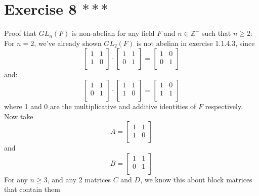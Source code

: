 \documentclass[12pt]{article}
\newcommand{\Z}{\mathbb{Z}}
\begin{document}
    \section*{Exercise 8 $***$}
    Proof that $GL_n(F)$ is non-abelian for any field $F$
    and $n \in \Z^+$ such that $n \geqslant 2$: \\
    For $n = 2$, we've already shown $GL_2(F)$ is not abelian in exercise
    1.1.4.3, since  
    \[ \begin{bmatrix}
        1 & 1 \\
        1 & 0 \\
    \end{bmatrix} \cdot
    \begin{bmatrix}
        1 & 1 \\
        0 & 1 \\
    \end{bmatrix}
    = \begin{bmatrix}
        1 & 0 \\
        0 & 1 \\
    \end{bmatrix} \]
    and: 
    \[ \begin{bmatrix}
        1 & 1 \\
        0 & 1 \\
    \end{bmatrix} \cdot
    \begin{bmatrix}
        1 & 1 \\
        1 & 0 \\
    \end{bmatrix}
    = \begin{bmatrix}
        1 & 0 \\
        1 & 1 \\
    \end{bmatrix} \]
    where 1 and 0 are the multiplicative and additive identities of
    $F$ respectively. \\
    Now take 
    \[ A = \begin{bmatrix}
        1 & 1 \\
        1 & 0 \\
    \end{bmatrix}\]
    and
    \[ B = \begin{bmatrix}
        1 & 1 \\
        0 & 1 \\
    \end{bmatrix} \]
    For any $n \geqslant 3$,
    and any 2 matrices $C$ and $D$,
    we know this about block matrices that contain them
\end{document}
